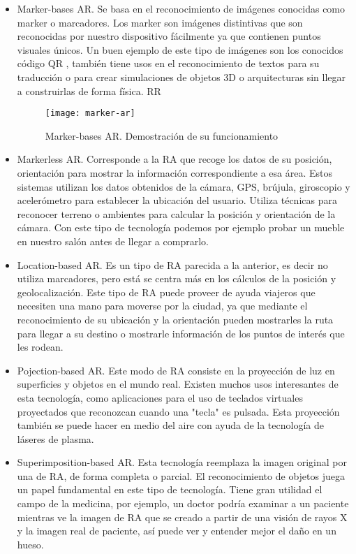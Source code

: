 \begin{itemize}
    \item 
    Marker-bases AR. Se basa en el reconocimiento de imágenes conocidas como marker o marcadores. Los marker son imágenes distintivas que son reconocidas por nuestro dispositivo fácilmente ya que contienen puntos visuales únicos. Un buen ejemplo de este tipo de imágenes son los conocidos código QR \cite{URL::CodigoQR}, también tiene usos en el reconocimiento de textos para su traducción o para crear simulaciones de objetos 3D o arquitecturas sin llegar a construirlas de forma física. RR

    \begin{figure}[h]
        \centering
        \texttt{[image: marker-ar]}
        \caption{Marker-bases AR. Demostración de su funcionamiento}
        \label{fig:markerAR}
    \end{figure}

    \item Markerless AR. Corresponde a la RA que recoge los datos de su posición, orientación  para mostrar la información correspondiente a esa área. Estos sistemas utilizan los datos obtenidos de la cámara, GPS, brújula, giroscopio y acelerómetro para establecer la ubicación del usuario. Utiliza técnicas para reconocer terreno o ambientes para calcular la posición y orientación de la cámara. Con este tipo de tecnología podemos por ejemplo probar un mueble en nuestro salón antes de llegar a comprarlo.
    
    \item Location-based AR. Es un tipo de RA parecida a la anterior, es decir no utiliza marcadores, pero está se centra más en los cálculos de la posición y geolocalización. Este tipo de RA puede proveer de ayuda viajeros que necesiten una mano para moverse por la ciudad, ya que mediante el reconocimiento de su ubicación y la orientación pueden mostrarles la ruta para llegar a su destino o mostrarle información de los puntos de interés que les rodean. 
 
    \item Pojection-based AR. Este modo de RA consiste en la proyección de luz en superficies y objetos en el mundo real. Existen muchos usos interesantes de esta tecnología, como aplicaciones para el uso de teclados virtuales proyectados que reconozcan cuando una "tecla" es pulsada. Esta proyección también se puede hacer en medio del aire con ayuda de la tecnología de láseres de plasma.

    \item Superimposition-based AR. Esta tecnología reemplaza la imagen original por una de RA, de forma completa o parcial. El reconocimiento de objetos juega un papel fundamental en este tipo de tecnología. Tiene gran utilidad el campo de la medicina, por ejemplo, un doctor podría examinar a un paciente mientras ve la imagen de RA que se creado a partir de una visión de rayos X y la imagen real de paciente, así puede ver y entender mejor el daño en un hueso.
\end{itemize} 



